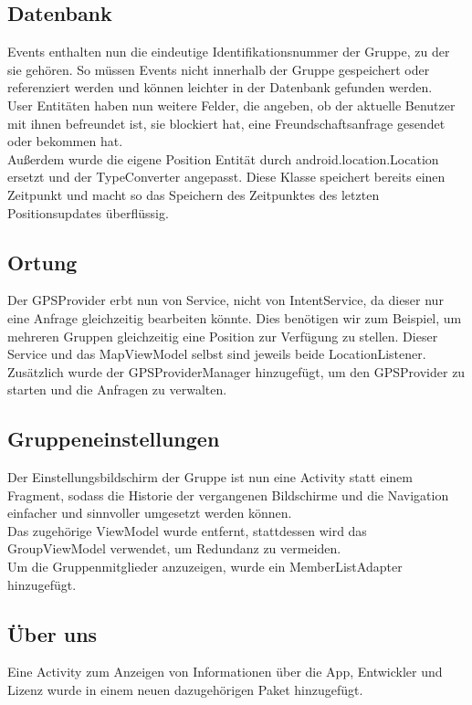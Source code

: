 \documentclass[parskip=full,11pt]{scrartcl}
\begin{document}
\subsection{Datenbank}
Events enthalten nun die eindeutige Identifikationsnummer der Gruppe,
zu der sie gehören. So müssen Events nicht innerhalb der Gruppe
gespeichert oder referenziert werden und können leichter in der
Datenbank gefunden werden.\\
User Entitäten haben nun weitere Felder, die angeben, ob der aktuelle Benutzer
mit ihnen befreundet ist, sie blockiert hat, eine Freundschaftsanfrage
gesendet oder bekommen hat.\\
Außerdem wurde die eigene Position Entität durch android.location.Location
ersetzt und der TypeConverter angepasst. Diese Klasse speichert bereits
einen Zeitpunkt und macht so das Speichern des Zeitpunktes des letzten
Positionsupdates überflüssig.

\subsection{Ortung}
Der GPSProvider erbt nun von Service, nicht von IntentService, da dieser
nur eine Anfrage gleichzeitig bearbeiten könnte. Dies benötigen wir
zum Beispiel, um mehreren Gruppen gleichzeitig eine Position zur
Verfügung zu stellen. Dieser Service und das MapViewModel selbst sind
jeweils beide LocationListener.\\
Zusätzlich wurde der GPSProviderManager hinzugefügt, um den
GPSProvider zu starten und die Anfragen zu verwalten.

\subsection{Gruppeneinstellungen}
Der Einstellungsbildschirm der Gruppe ist nun eine Activity statt einem
Fragment, sodass die Historie der vergangenen Bildschirme und die
Navigation einfacher und sinnvoller umgesetzt werden können.\\
Das zugehörige ViewModel wurde entfernt, stattdessen wird das
GroupViewModel verwendet, um Redundanz zu vermeiden.\\
Um die Gruppenmitglieder anzuzeigen, wurde ein MemberListAdapter
hinzugefügt.

\subsection{Über uns}
Eine Activity zum Anzeigen von Informationen über die App, Entwickler und
Lizenz wurde in einem neuen dazugehörigen Paket hinzugefügt.
\end{document}
